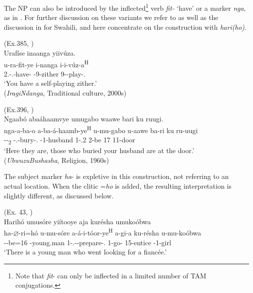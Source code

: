 \documentclass[output=paper]{langscibook}
\begin{document}
\z

The NP can also be introduced by the inflected\footnote{Note that \textit{fit}- can only be inflected in a limited number of TAM conjugations.} verb \textit{fit-} ‘have’  or a marker \textit{nga}, as in . For further discussion on these variants we refer to \citet{Nshemezimana2016} as well as the discussion in \citet{Marten2013} for Swahili, and here concentrate on the construction with \textit{hari(ho)}.

\ea
\label{bkm:Ref93471637}
(Ex.385, \citealt[260]{Nshemezimana2016})\\
Urafíse inaanga yiivúza.\\
\gll
u-ra-fit-ye  i-nanga  i-i-vúz-a\textsuperscript{H}\\
2\SG.\SM-\PRS.\DJ-{}have-\PFV{}  \AUG{}-9-{}zither  9\SM-\REFL-{}play-\FV.\REL{}\\
\glt
‘You have a self-playing zither.’\\
  (\textit{IragiNdanga}, Traditional culture, 2000s)


\ex
\label{bkm:Ref106269434}
(Ex.396, \citealt[260]{Nshemezimana2016})\\
Ngaabó abaáhaamvye umugabo waawe bari ku ruugi.\\
\gll
nga-a-ba-o  a-ba-á-haamb-ye\textsuperscript{H}  u-mu-gabo  u-aawe   ba-ri  ku  ru-uugi \\
\PRSNT--\DEM{}\textsubscript{2}  -\RMT.\PST-{}bury-\PFV{}.\REL{}  \AUG{}-1-{}husband  1-\POSS.2\SG{}   2\SM-{}be  17  11-door \\
\glt
‘Here they are, those who buried your husband are at the door.’  (\textit{UbwuzuBushasha}, Religion, 1960s)\\

\z

The subject marker \textit{ha}- is expletive in this construction, not referring to an actual location. When the clitic =\textit{ho} is added, the resulting interpretation is slightly different, as discussed below.

\ea
\label{bkm:Ref76658329}
\label{bkm:Ref73366995}(Ex. 43, \citealt[41]{Nshemezimana2016})\\
Harihó umusóre yiítooye aja kurésha umukoóbwa\\
\gll
ha-$\varnothing$-ri=hó  u-mu-sóre  a-á-i-tóor-ye\textsuperscript{H}   a-gi-a  ku-résha  u-mu-koóbwa \\
\EXP-\PRS-{}be=16  -young.man  1\SM-\RMT.\PST-\REFL-{}prepare-\PFV.\REL{}   1\SM-{}go-\FV{}  {}15-{}entice  \AUG{}-1-{}girl \\
\glt
  ‘There is a young man who went looking for a fiancée.’\\
\end{document}
